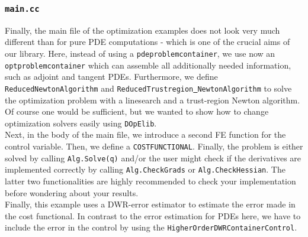 \subsubsection{\texttt{main.cc}}
Finally, the main file of the optimization examples does not look very much 
different than for pure PDE computations - which is one of the crucial aims 
of our library. 
Here, instead of using a \texttt{pdeproblemcontainer}, we use 
now an \texttt{optproblemcontainer} which can assemble all additionally needed information,
such as adjoint and tangent PDEs. 
Furthermore, we define \texttt{ReducedNewtonAlgorithm} and 
\texttt{ReducedTrustregion\underline{ }NewtonAlgorithm}
to solve the optimization problem with a linesearch and a trust-region Newton algorithm.
Of course one would be sufficient, but we wanted to show how to change optimization 
solvers easily using \texttt{DOpElib}.\\
Next, in the body of the main file, we introduce a second FE function for the 
control variable. Then, we define 
a \texttt{COSTFUNCTIONAL}. Finally, the problem is either solved 
by calling \texttt{Alg.Solve(q)} and/or the user might check if the 
derivatives are implemented correctly by calling 
\texttt{Alg.CheckGrads} or \texttt{Alg.CheckHessian}. The latter 
two functionalities are highly recommended to check your
implementation before wondering about your results.\\
Finally, this example uses a DWR-error estimator to estimate the 
error made in the cost functional. In contrast to the 
error estimation for PDEs here, we have to include the error in the
control by using the \texttt{HigherOrderDWRContainerControl}.
